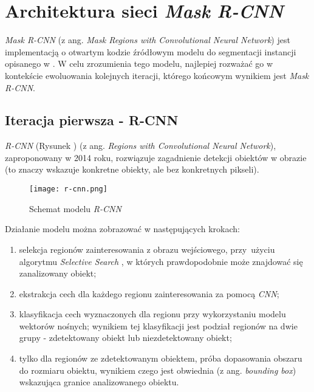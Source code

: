 \section{Architektura sieci \textit{Mask R-CNN}}
\label{sec:architekrura_mask_rcnn}

\textit{Mask R-CNN} \cite{matterport-mask-rcnn} (z ang. \textit{Mask Regions with Convolutional Neural Network}) jest implementacją o otwartym kodzie źródłowym modelu do segmentacji instancji opisanego w \cite{general-mask-rcnn}.
W celu zrozumienia tego modelu, najlepiej rozważać go w kontekście ewoluowania kolejnych iteracji, którego końcowym wynikiem jest \textit{Mask R-CNN}.

\subsection{Iteracja pierwsza - R-CNN}

\textit{R-CNN} \cite{rcnn} (Rysunek ) (z ang. \textit{Regions with Convolutional Neural Network}), zaproponowany w 2014 roku, rozwiązuje zagadnienie detekcji obiektów w obrazie (to znaczy wskazuje konkretne obiekty, ale bez konkretnych pikseli).

\begin{figure}[h]
  \centering
  \texttt{[image: r-cnn.png]}
  \caption{Schemat modelu \textit{R-CNN}}
  \label{fig:r_cnn}
\end{figure}

Działanie modelu można zobrazować w następujących krokach:
\label{sec:regiony}
\begin{enumerate}
  \item selekcja regionów zainteresowania z obrazu wejściowego, przy~użyciu algorytmu \textit{Selective Search} \cite{selective-search}, w których prawdopodobnie może znajdować się zanalizowany obiekt;
  \item ekstrakcja cech dla każdego regionu zainteresowania za pomocą \textit{CNN};
  \item klasyfikacja cech wyznaczonych dla regionu przy wykorzystaniu modelu wektorów nośnych; wynikiem tej klasyfikacji jest podział regionów na dwie grupy - zdetektowany obiekt lub niezdetektowany obiekt;
  \item tylko dla regionów ze zdetektowanym obiektem, próba dopasowania obszaru do rozmiaru obiektu, wynikiem czego jest obwiednia (z ang. \textit{bounding box}) wskazująca granice analizowanego obiektu.
\end{enumerate}

